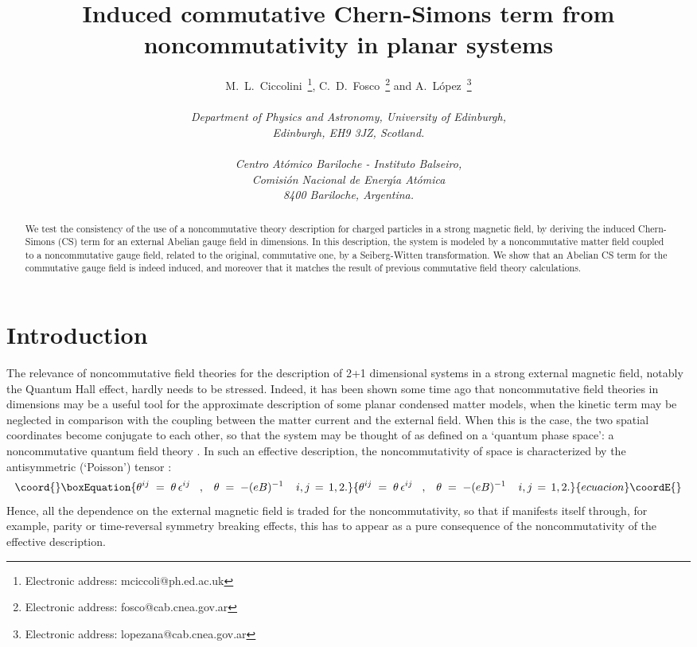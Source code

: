 \documentclass[a4paper,12pt]{article}
\title{Induced commutative Chern-Simons term from noncommutativity in
  planar systems}
\author{M.~L.~Ciccolini\myHighlight{$^a$}\coordHE{}~\footnote{Electronic address:
    mciccoli@ph.ed.ac.uk}, C.~D.~Fosco\myHighlight{$^b$}\coordHE{}~\footnote{Electronic
    address: fosco@cab.cnea.gov.ar} and
  A.~L{\'o}pez\myHighlight{$^b$}\coordHE{}~\footnote{Electronic address: lopezana@cab.cnea.gov.ar}
  \\ \\
  {\normalsize\it \myHighlight{$^a$}\coordHE{}Department of Physics and Astronomy, University of Edinburgh,}\\
  {\normalsize\it Edinburgh, EH9 3JZ, Scotland.}\\ \\
  {\normalsize\it \myHighlight{$^b$}\coordHE{}Centro At{\'o}mico Bariloche - Instituto Balseiro,}\\
  {\normalsize\it Comisi{\'o}n Nacional de Energ{\'\i}a At{\'o}mica}\\
  {\normalsize\it 8400 Bariloche, Argentina.}}
\date{}
\begin{document}
\maketitle
\begin{abstract}
\noindent We test the consistency of the use of a noncommutative 
theory description for charged particles in a strong magnetic field,
by deriving the induced Chern-Simons (CS) term for an external Abelian
gauge field in \coordHE{} dimensions.  In this description, the system is
modeled by a noncommutative matter field coupled to a \coordHE{}
noncommutative gauge field, related to the original, commutative one,
by a Seiberg-Witten transformation.  We show that an Abelian CS term
for the commutative gauge field is indeed induced, and moreover that
it matches the result of previous commutative field theory
calculations.
\end{abstract}
\newpage
\section{Introduction}\label{sec:intro}
The relevance of noncommutative field theories for the description of
2+1 dimensional systems in a strong external magnetic field, notably
the Quantum Hall effect, hardly needs to be stressed.  Indeed, it has
been shown some time ago that noncommutative field theories in \coordHE{}
dimensions may be a useful tool for the approximate description of
some planar condensed matter models, when the kinetic term may be
neglected in comparison with the coupling between the matter current
and the external field. When this is the case, the two spatial
coordinates become conjugate to each other, so that the system may be
thought of as defined on a `quantum phase space': a noncommutative
quantum field theory \cite{susskind,PP,KS,MS,PA,LMR,DN,AP,cesarana}.  
In such
 an effective description, the noncommutativity of space is
characterized by the antisymmetric (`Poisson') tensor \coordHE{}:
\begin{equation}\coord{}\boxEquation{
\theta^{ij}\;=\; \theta \, \epsilon^{ij} \;\;\;,\;\;\; 
\theta \;=\; - (eB)^{-1} \;\;\;\; i,j \,=\, 1,2.
}{
\theta^{ij}\;=\; \theta \, \epsilon^{ij} \;\;\;,\;\;\; 
\theta \;=\; - (eB)^{-1} \;\;\;\; i,j \,=\, 1,2.
}{ecuacion}\coordE{}\end{equation}
Hence, all the dependence on the external magnetic field is traded for
the noncommutativity, so that if \coordHE{} manifests itself through, for
example, parity or time-reversal symmetry breaking effects, this has
to appear as a pure consequence of the noncommutativity of the
effective description.
\end{document}
